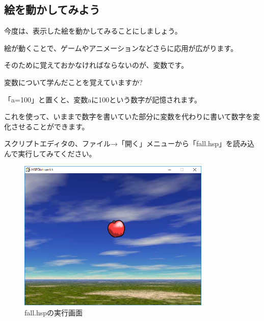 \newpage
\subsection{絵を動かしてみよう}



今度は、表示した絵を動かしてみることにしましょう。

絵が動くことで、ゲームやアニメーションなどさらに応用が広がります。

そのために覚えておかなければならないのが、変数です。


変数について学んだことを覚えていますか?


\begin{description}
    \item {}
    \item {}
    \item {}
    \item {}
\end{description}

「a=100」と置くと、変数aに100という数字が記憶されます。

これを使って、いままで数字を書いていた部分に変数を代わりに書いて数字を変化させることができます。

スクリプトエディタの、ファイル→「開く」メニューから「fall.hsp」を読み込んで実行してみてください。



\begin{figure}[H]
    \begin{center}
      \includegraphics[keepaspectratio,width=9.183cm,height=7.241cm]{text04-img/text04-img019.png}
      \caption{fall.hspの実行画面}
    \end{center}
    \label{fig:prog_menu}
\end{figure}

